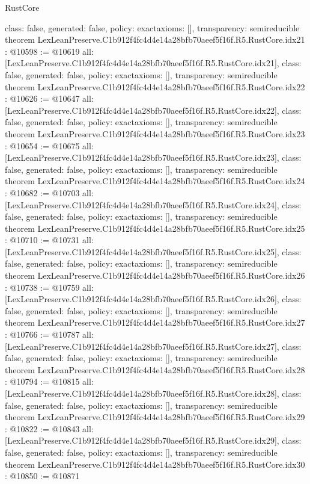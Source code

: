 \begin{lexlean}{RustCore}
\begin{coremodule}
{  class: false,
  generated: false,
  policy: exact{axioms: []},
  transparency: semireducible
}
theorem LexLeanPreserve.C1b912f4fc4d4e14a28bfb70aeef5f16f.R5.RustCore.idx21 : @10598 := @10619 {
  all: [LexLeanPreserve.C1b912f4fc4d4e14a28bfb70aeef5f16f.R5.RustCore.idx21],
  class: false,
  generated: false,
  policy: exact{axioms: []},
  transparency: semireducible
}
theorem LexLeanPreserve.C1b912f4fc4d4e14a28bfb70aeef5f16f.R5.RustCore.idx22 : @10626 := @10647 {
  all: [LexLeanPreserve.C1b912f4fc4d4e14a28bfb70aeef5f16f.R5.RustCore.idx22],
  class: false,
  generated: false,
  policy: exact{axioms: []},
  transparency: semireducible
}
theorem LexLeanPreserve.C1b912f4fc4d4e14a28bfb70aeef5f16f.R5.RustCore.idx23 : @10654 := @10675 {
  all: [LexLeanPreserve.C1b912f4fc4d4e14a28bfb70aeef5f16f.R5.RustCore.idx23],
  class: false,
  generated: false,
  policy: exact{axioms: []},
  transparency: semireducible
}
theorem LexLeanPreserve.C1b912f4fc4d4e14a28bfb70aeef5f16f.R5.RustCore.idx24 : @10682 := @10703 {
  all: [LexLeanPreserve.C1b912f4fc4d4e14a28bfb70aeef5f16f.R5.RustCore.idx24],
  class: false,
  generated: false,
  policy: exact{axioms: []},
  transparency: semireducible
}
theorem LexLeanPreserve.C1b912f4fc4d4e14a28bfb70aeef5f16f.R5.RustCore.idx25 : @10710 := @10731 {
  all: [LexLeanPreserve.C1b912f4fc4d4e14a28bfb70aeef5f16f.R5.RustCore.idx25],
  class: false,
  generated: false,
  policy: exact{axioms: []},
  transparency: semireducible
}
theorem LexLeanPreserve.C1b912f4fc4d4e14a28bfb70aeef5f16f.R5.RustCore.idx26 : @10738 := @10759 {
  all: [LexLeanPreserve.C1b912f4fc4d4e14a28bfb70aeef5f16f.R5.RustCore.idx26],
  class: false,
  generated: false,
  policy: exact{axioms: []},
  transparency: semireducible
}
theorem LexLeanPreserve.C1b912f4fc4d4e14a28bfb70aeef5f16f.R5.RustCore.idx27 : @10766 := @10787 {
  all: [LexLeanPreserve.C1b912f4fc4d4e14a28bfb70aeef5f16f.R5.RustCore.idx27],
  class: false,
  generated: false,
  policy: exact{axioms: []},
  transparency: semireducible
}
theorem LexLeanPreserve.C1b912f4fc4d4e14a28bfb70aeef5f16f.R5.RustCore.idx28 : @10794 := @10815 {
  all: [LexLeanPreserve.C1b912f4fc4d4e14a28bfb70aeef5f16f.R5.RustCore.idx28],
  class: false,
  generated: false,
  policy: exact{axioms: []},
  transparency: semireducible
}
theorem LexLeanPreserve.C1b912f4fc4d4e14a28bfb70aeef5f16f.R5.RustCore.idx29 : @10822 := @10843 {
  all: [LexLeanPreserve.C1b912f4fc4d4e14a28bfb70aeef5f16f.R5.RustCore.idx29],
  class: false,
  generated: false,
  policy: exact{axioms: []},
  transparency: semireducible
}
theorem LexLeanPreserve.C1b912f4fc4d4e14a28bfb70aeef5f16f.R5.RustCore.idx30 : @10850 := @10871 {
}
\end{coremodule}
\end{lexlean}
